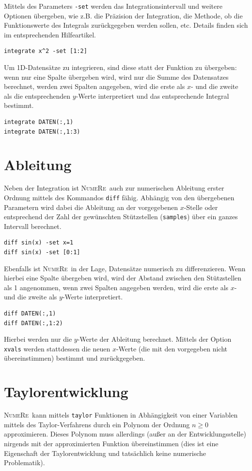\documentclass[DIV=14,headsepline,footsepline]{scrbook}
\newcommand{\NR}{\textsc{Nu\-me\-Re}}
\begin{document}
				Mittels des Parameters \verb+-set+ werden das Integrationsintervall und weitere Optionen übergeben, wie z.B. die Präzision der Integration, die Methode, ob die Funktionswerte des Integrals zurückgegeben werden sollen, etc. Details finden sich im entsprechenden Hilfeartikel.
				\begin{lstlisting}
integrate x^2 -set [1:2]
				\end{lstlisting}
				
				Um 1D-Datensätze zu integrieren, sind diese statt der Funktion zu übergeben: wenn nur eine Spalte übergeben wird, wird nur die Summe des Datensatzes berechnet, werden zwei Spalten angegeben, wird die erste als $x$- und die zweite als die entsprechenden $y$-Werte interpretiert und das entsprechende Integral bestimmt.
				\begin{lstlisting}
integrate DATEN(:,1)
integrate DATEN(:,1:3)
				\end{lstlisting}
				
			\section{Ableitung}
				Neben der Integration ist \NR\ auch zur numerischen Ableitung erster Ordnung mittels des Kommandos \verb+diff+ fähig. Abhängig von den übergebenen Parametern wird dabei die Ableitung an der vorgegebenen $x$-Stelle oder entsprechend der Zahl der gewünschten Stützstellen (\verb+samples+) über ein ganzes Intervall berechnet.
				\begin{lstlisting}
diff sin(x) -set x=1
diff sin(x) -set [0:1]
				\end{lstlisting}
				
				Ebenfalls ist \NR\ in der Lage, Datensätze numerisch zu differenzieren. Wenn hierbei eine Spalte übergeben wird, wird der Abstand zwischen den Stützstellen als 1 angenommen, wenn zwei Spalten angegeben werden, wird die erste als $x$- und die zweite als $y$-Werte interpretiert.
				\begin{lstlisting}
diff DATEN(:,1)
diff DATEN(:,1:2)
				\end{lstlisting}
				Hierbei werden nur die $y$-Werte der Ableitung berechnet. Mittels der Option \verb+xvals+ werden stattdessen die neuen $x$-Werte (die mit den vorgegeben nicht übereinstimmen) bestimmt und zurückgegeben.
				
			\section{Taylorentwicklung}
				\NR\ kann mittels \verb+taylor+ Funktionen in Abhängigkeit von einer Variablen mittels des Taylor-Verfahrens durch ein Polynom der Ordnung $n \geq 0$ approximieren. Dieses Polynom muss allerdings (außer an der Entwicklungsstelle) nirgends mit der approximierten Funktion übereinstimmen (dies ist eine Eigenschaft der Taylorentwicklung und tatsächlich keine numerische Problematik).
	
\end{document}
